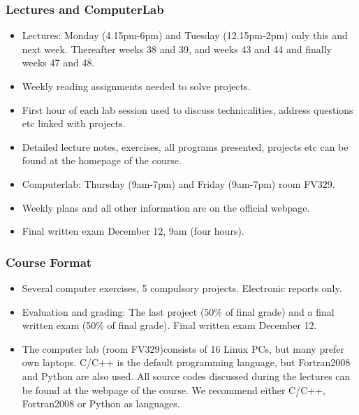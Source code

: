 \documentclass[compress]{beamer}
\begin{document}
\frame
{
  \frametitle{Lectures and ComputerLab}
  \begin{block}{}
\begin{itemize}
\item Lectures: Monday (4.15pm-6pm) and Tuesday (12.15pm-2pm) only this and next week. Thereafter weeks 38 and 39,
and weeks 43 and 44 and finally weeks 47 and 48.
\item Weekly reading assignments needed to solve projects.
\item First hour of each lab session used to discuss technicalities, address questions etc linked with projects.
       \item Detailed lecture notes, exercises, all programs presented, projects etc
can be found at the homepage of the course.
       \item Computerlab: Thursday (9am-7pm) and Friday (9am-7pm) room FV329.
       \item Weekly plans and all other information are on the official webpage.
\item Final written exam December 12, 9am (four hours).
\end{itemize}
  \end{block}
}


\frame
{
  \frametitle{Course Format}
  \begin{block}{}
\begin{itemize}
\item Several computer exercises, 5 compulsory projects. Electronic reports
only.
       \item Evaluation and grading: The last project (50\% of final grade) and a  final written exam (50\% of final grade). Final written exam December 12.

       \item The computer lab (room FV329)consists of  16 Linux PCs, but many prefer own laptops. C/C++ is the default
programming language, but Fortran2008 and Python are also used. All source codes discussed
during the lectures can be found at the webpage of the course.
We recommend either C/C++, Fortran2008
or Python as languages.
\end{itemize}
  \end{block}
}
\end{document}
